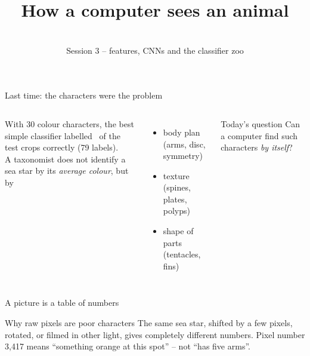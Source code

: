\documentclass[aspectratio=169,11pt]{beamer}
\title{How a computer sees an animal}
\subtitle{\coursetitle\\[2pt]\small Session 3 -- features, CNNs and the classifier zoo}
\date{}
\author{}
\begin{document}
\maketitle

\begin{frame}{Last time: the characters were the problem}
\begin{columns}[c]
With 30 colour characters, the best simple classifier labelled \RefCSLabelBest\ of the test crops correctly (79 labels).\\[6pt]
A taxonomist does not identify a sea star by its \emph{average colour}, but by
\begin{itemize}\small
  \item body plan (arms, disc, symmetry)
  \item texture (spines, plates, polyps)
  \item shape of parts (tentacles, fins)
\end{itemize}
\begin{block}{Today's question}
Can a computer find such characters \emph{by itself}?
\end{block}
\end{columns}
\end{frame}

\begin{frame}{A picture is a table of numbers}
\centering
{}
\vspace{10pt}
\begin{alertblock}{Why raw pixels are poor characters}
The same sea star, shifted by a few pixels, rotated, or filmed in other light, gives completely different numbers.
Pixel number 3{,}417 means ``something orange at this spot'' -- not ``has five arms''.
\end{alertblock}
\end{frame}
\end{document}
